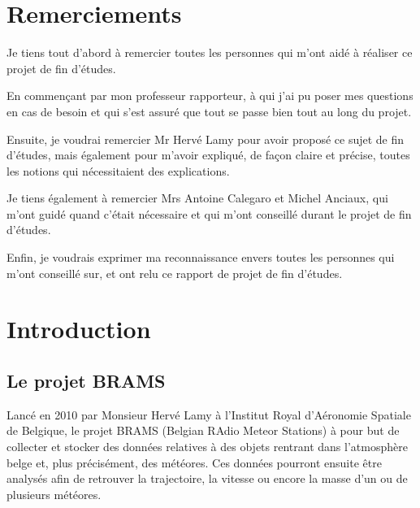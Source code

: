 \documentclass[11pt]{article}
\newenvironment{remerciements}
  {
   \thispagestyle{empty}%
   \vspace*{\stretch{1}}%
   \itshape             %
  }
  {\par %
   \vspace{\stretch{3}} %
   \clearpage           %
  }
\begin{document}
\section*{Remerciements}
\begin{remerciements}
    Je tiens tout d'abord à remercier toutes les personnes qui m'ont aidé à réaliser ce projet de fin d'études.\\
    \par
    En commençant par mon professeur rapporteur, à qui j'ai pu poser mes questions en cas de besoin et qui s'est assuré que tout se passe bien tout au long du projet.\\
    \par
    Ensuite, je voudrai remercier Mr Hervé Lamy pour avoir proposé ce sujet de fin d'études, mais également pour m'avoir expliqué, de façon claire et précise, toutes les notions qui nécessitaient des explications.\\
    \par
    Je tiens également à remercier Mrs Antoine Calegaro et Michel Anciaux, qui m'ont guidé quand c'était nécessaire et qui m'ont conseillé durant le projet de fin d'études.\\
    \par
    Enfin, je voudrais exprimer ma reconnaissance envers toutes les personnes qui m'ont conseillé sur, et ont relu ce rapport de projet de fin d'études.
\end{remerciements}

\newpage

\tableofcontents

\newpage

\section{Introduction}

\subsection{Le projet BRAMS}

Lancé en 2010 par Monsieur Hervé Lamy à l'Institut Royal d'Aéronomie Spatiale de Belgique, le projet BRAMS (Belgian RAdio Meteor Stations) à pour but de collecter et stocker des données relatives à des objets rentrant dans l'atmosphère belge et, plus précisément, des météores.
Ces données pourront ensuite être analysés afin de retrouver la trajectoire, la vitesse ou encore la masse d'un ou de plusieurs météores.\\
\end{document}
